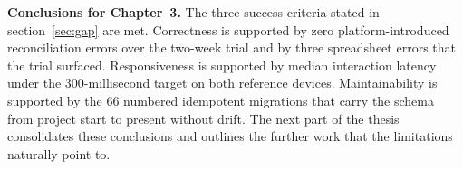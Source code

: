 \noindent\textbf{Conclusions for Chapter~3.}
The three success criteria stated in section~\ref{sec:gap} are met. Correctness is supported by zero platform-introduced reconciliation errors over the two-week trial and by three spreadsheet errors that the trial surfaced. Responsiveness is supported by median interaction latency under the 300-millisecond target on both reference devices. Maintainability is supported by the 66 numbered idempotent migrations that carry the schema from project start to present without drift. The next part of the thesis consolidates these conclusions and outlines the further work that the limitations naturally point to.
